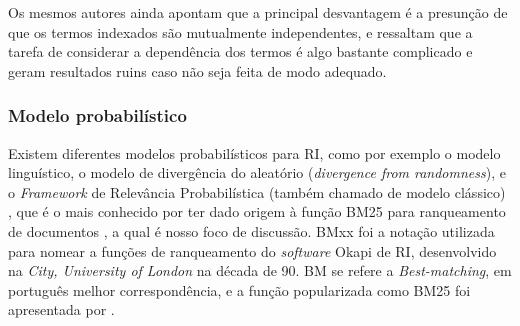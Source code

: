         Os mesmos autores ainda apontam que a principal desvantagem é a presunção de que os termos indexados são mutualmente independentes, e ressaltam que a tarefa de considerar a dependência dos termos é algo bastante complicado e geram resultados ruins caso não seja feita de modo adequado.
    
    \subsubsection{Modelo probabilístico}  \label{subsubsec:Modelo-probabilístico}
        Existem diferentes modelos probabilísticos para RI, como por exemplo o modelo linguístico, o modelo de divergência do aleatório (\textit{divergence from randomness}), e o \textit{Framework} de Relevância Probabilística (também chamado de modelo clássico) \cite[p.~87]{Zhai2016TDMA}, que é o mais conhecido por ter dado origem à função BM25 para ranqueamento de documentos \cite[p.~334--335]{robertson_probabilistic_2010} \cite[p.~111]{Zhai2016TDMA}, a qual é nosso foco de discussão.
        BMxx foi a notação utilizada para nomear a funções de ranqueamento do \textit{software} Okapi de RI, desenvolvido na \textit{City, University of London} na década de 90. BM se refere a \textit{Best-matching}, em português melhor correspondência, e a função popularizada como BM25 foi apresentada por .
        

